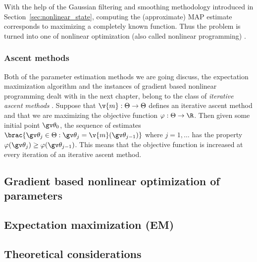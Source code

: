 With the help of the Gaussian filtering and smoothing methodology introduced in 
Section~\ref{sec:nonlinear_state}, computing the (approximate) MAP estimate 
corresponds to maximizing a completely known function.
Thus the problem is turned into one of nonlinear optimization 
(also called nonlinear programming) \parencite{Cappe2005}.

\subsubsection{Ascent methods}

Both of the parameter estimation methods we are going
discuss, the expectation maximization algorithm and
the instances of gradient based nonlinear programming dealt with in the
next chapter, belong to the class of \emph{iterative ascent methods} \parencite{luenberger2008}.
Suppose that $\v{m}:\Theta \to \Theta$ defines an iterative ascent method
and that we are maximizing the objective function $\varphi:\Theta\to\R$.
Then given some initial point $\Th_0$, the sequence of estimates
$\brac{\Th_j \in \Theta: \Th_j=\v{m}(\Th_{j-1})}$ where $j=1,\dots$
has the property $\varphi(\Th_{j})\geq \varphi(\Th_{j-1})$. This means
that the objective function is increased at every iteration of
an iterative ascent method.

\subsection{Gradient based nonlinear optimization of parameters}\label{sec:grad}%


\subsection{Expectation maximization (EM)}\label{sec:em}%


\subsection{Theoretical considerations}\label{sec:theory}%



